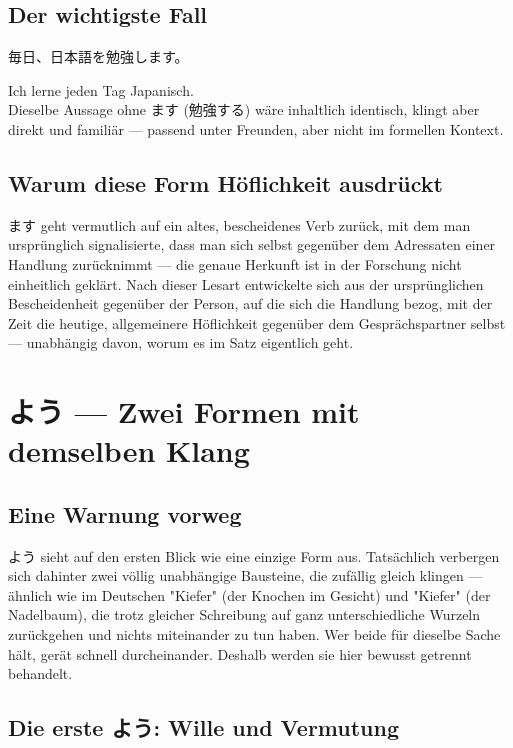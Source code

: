 \documentclass[12pt]{book}
\begin{document}
\section*{Der wichtigste Fall}

\par\quad 毎日、日本語を勉強します。\\
\par\quad Ich lerne jeden Tag Japanisch.\\

Dieselbe Aussage ohne ます (勉強する) wäre inhaltlich identisch, klingt aber direkt und familiär — passend unter Freunden, aber nicht im formellen Kontext.

\section*{Warum diese Form Höflichkeit ausdrückt}

ます geht vermutlich auf ein altes, bescheidenes Verb zurück, mit dem man ursprünglich signalisierte, dass man sich selbst gegenüber dem Adressaten einer Handlung zurücknimmt — die genaue Herkunft ist in der Forschung nicht einheitlich geklärt. Nach dieser Lesart entwickelte sich aus der ursprünglichen Bescheidenheit gegenüber der Person, auf die sich die Handlung bezog, mit der Zeit die heutige, allgemeinere Höflichkeit gegenüber dem Gesprächspartner selbst — unabhängig davon, worum es im Satz eigentlich geht.


\chapter{よう — Zwei Formen mit demselben Klang}

\section*{Eine Warnung vorweg}

よう sieht auf den ersten Blick wie eine einzige Form aus. Tatsächlich verbergen sich dahinter zwei völlig unabhängige Bausteine, die zufällig gleich klingen — ähnlich wie im Deutschen "Kiefer" (der Knochen im Gesicht) und "Kiefer" (der Nadelbaum), die trotz gleicher Schreibung auf ganz unterschiedliche Wurzeln zurückgehen und nichts miteinander zu tun haben. Wer beide für dieselbe Sache hält, gerät schnell durcheinander. Deshalb werden sie hier bewusst getrennt behandelt.

\section*{Die erste よう: Wille und Vermutung}
\end{document}
